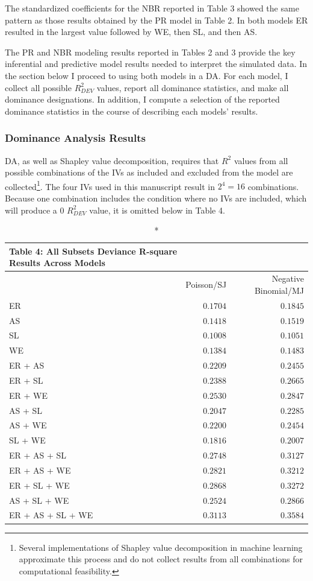\documentclass[ShortAfour,times,sageapa]{sagej}
\begin{document}
	The standardized coefficients for the NBR reported in Table 3 showed the same pattern as those results obtained by the  PR model in Table 2. 
	In both models ER resulted in the largest value followed by WE, then SL, and then AS.
	
	The PR and NBR modeling results reported in Tables 2 and 3 provide the key inferential and predictive model results needed to interpret the simulated data.
	In the section below I proceed to using both models in a DA.
	For each model, I collect all possible $R^2_{DEV}$ values, report all dominance statistics, and make all dominance designations.
	In addition, I compute a selection of the reported dominance statistics in the course of describing each models' results.
	
		\subsubsection{Dominance Analysis Results}
		
	DA, as well as Shapley value decomposition, requires that $R^2$ values from all possible combinations of the IVs as included and excluded from the model are collected\footnote{Several implementations of Shapley value decomposition in machine learning approximate this process and do not collect results from all combinations for computational feasibility.}.
	The four IVs used in this manuscript result in $2^4 = 16$ combinations.
	Because one combination includes the condition where no IVs are included, which will produce a 0 $R^2_{DEV}$ value, it is omitted below in Table 4.
	
	\begin{longtable}{l|rr}
		\caption*{
			{\large Table 4: All Subsets Deviance R-square Results Across Models}
		} \\ 
		\toprule
		\multicolumn{1}{l}{} & Poisson/SJ & Negative Binomial/MJ \\ 
		\midrule
		ER & $0.1704$ & $0.1845$ \\ 
		AS & $0.1418$ & $0.1519$ \\ 
		SL & $0.1008$ & $0.1051$ \\ 
		WE & $0.1384$ & $0.1483$ \\ 
		ER + AS & $0.2209$ & $0.2455$ \\ 
		ER + SL & $0.2388$ & $0.2665$ \\ 
		ER + WE & $0.2530$ & $0.2847$ \\ 
		AS + SL & $0.2047$ & $0.2285$ \\ 
		AS + WE & $0.2200$ & $0.2454$ \\ 
		SL + WE & $0.1816$ & $0.2007$ \\ 
		ER + AS + SL & $0.2748$ & $0.3127$ \\ 
		ER + AS + WE & $0.2821$ & $0.3212$ \\ 
		ER + SL + WE & $0.2868$ & $0.3272$ \\ 
		AS + SL + WE & $0.2524$ & $0.2866$ \\ 
		ER + AS + SL + WE & $0.3113$ & $0.3584$ \\ 
		\bottomrule
	\end{longtable}
\end{document}

